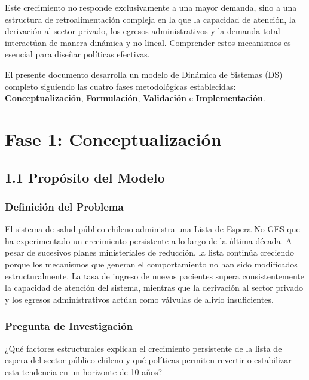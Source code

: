 \documentclass[12pt,a4paper]{article}
\begin{document}
Este crecimiento no responde exclusivamente a una mayor demanda, sino a una estructura de retroalimentación compleja en la que la capacidad de atención, la derivación al sector privado, los egresos administrativos y la demanda total interactúan de manera dinámica y no lineal. Comprender estos mecanismos es esencial para diseñar políticas efectivas.

El presente documento desarrolla un modelo de Dinámica de Sistemas (DS) completo siguiendo las cuatro fases metodológicas establecidas: \textbf{Conceptualización}, \textbf{Formulación}, \textbf{Validación} e \textbf{Implementación}.

\section{Fase 1: Conceptualización}

\subsection{1.1 Propósito del Modelo}

\subsubsection*{Definición del Problema}

El sistema de salud público chileno administra una Lista de Espera No GES que ha experimentado un crecimiento persistente a lo largo de la última década. A pesar de sucesivos planes ministeriales de reducción, la lista continúa creciendo porque los mecanismos que generan el comportamiento no han sido modificados estructuralmente. La tasa de ingreso de nuevos pacientes supera consistentemente la capacidad de atención del sistema, mientras que la derivación al sector privado y los egresos administrativos actúan como válvulas de alivio insuficientes.

\subsubsection*{Pregunta de Investigación}

\begin{tcolorbox}[colback=azulDS!5,colframe=azulDS!60]
¿Qué factores estructurales explican el crecimiento persistente de la lista de espera del sector público chileno y qué políticas permiten revertir o estabilizar esta tendencia en un horizonte de 10 años?
\end{tcolorbox}
\end{document}

